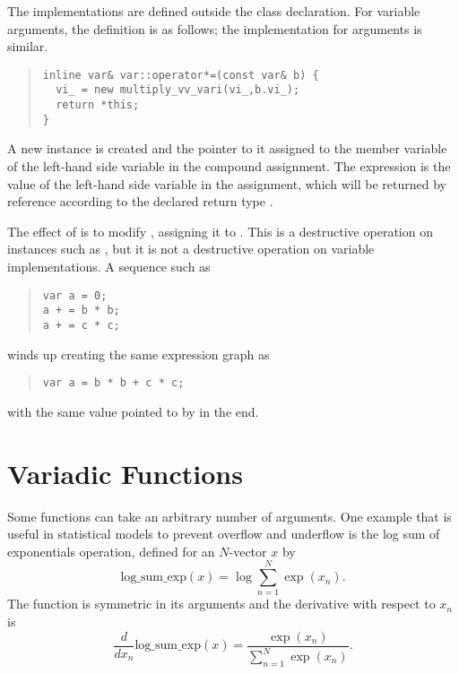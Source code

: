 \documentclass[10pt]{article}
\begin{document}
The implementations are defined outside the class declaration.  For variable
arguments, the definition is as follows; the implementation for
 arguments is similar.
%
\begin{quote}
\begin{Verbatim}
inline var& var::operator*=(const var& b) {
  vi_ = new multiply_vv_vari(vi_,b.vi_);
  return *this;
}
\end{Verbatim}
\end{quote}
%
A new  instance is created and the pointer to
it assigned to the member variable  of the left-hand side
variable in the compound assignment.  The expression  is
the value of the left-hand side variable in the assignment, which will
be returned by reference according to the declared return type
.

The effect of  is to modify , assigning it to
.  This is a destructive operation on  instances
such as , but it is not a destructive operation on variable
implementations.  A sequence such as 
%
\begin{quote}
\begin{Verbatim}
var a = 0;
a + = b * b;
a + = c * c;
\end{Verbatim}
\end{quote}
%
winds up creating the same expression graph as
%
\begin{quote}
\begin{Verbatim}
var a = b * b + c * c;
\end{Verbatim}
\end{quote}
%
with the same value pointed to by  in the end.


\section{Variadic Functions}\label{variadic-functions.section}

Some functions can take an arbitrary number of arguments.  One example
that is useful in statistical models to prevent overflow and underflow
is the log sum of exponentials operation, defined for an $N$-vector
$x$ by
%
\[
\mbox{log\_sum\_exp}(x) 
= \log \sum_{n=1}^N \exp(x_n).
\]
%
The function is symmetric in its arguments and the derivative with
respect to $x_n$ is
\[
\frac{d}{d x_n} \mbox{log\_sum\_exp}(x)
= \frac{\exp(x_n)}{\sum_{n=1}^N \exp(x_n)}.
\]
\end{document}
